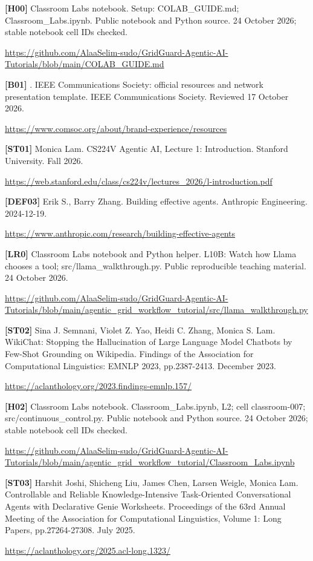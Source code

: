 \documentclass[12pt,letterpaper]{article}
\begin{document}
{\small
\textbf{[H00]} Classroom Labs notebook. Setup: COLAB\_\allowbreak{}GUIDE.md; Classroom\_\allowbreak{}Labs.ipynb. Public notebook and Python source. 24 October 2026; stable notebook cell IDs checked.\par\url{https://github.com/AlaaSelim-sudo/GridGuard-Agentic-AI-Tutorials/blob/main/COLAB_GUIDE.md}\par\medskip
\textbf{[B01]} . IEEE Communications Society: official resources and network presentation template. IEEE Communications Society. Reviewed 17 October 2026.\par\url{https://www.comsoc.org/about/brand-experience/resources}\par\medskip
\textbf{[ST01]} Monica Lam. CS224V Agentic AI, Lecture 1: Introduction. Stanford University. Fall 2026.\par\url{https://web.stanford.edu/class/cs224v/lectures_2026/l-introduction.pdf}\par\medskip
\textbf{[DEF03]} Erik S., Barry Zhang. Building effective agents. Anthropic Engineering. 2024-12-19.\par\url{https://www.anthropic.com/research/building-effective-agents}\par\medskip
\textbf{[LR0]} Classroom Labs notebook and Python helper. L10B: Watch how Llama chooses a tool; src/\allowbreak{}llama\_\allowbreak{}walkthrough.py. Public reproducible teaching material. 24 October 2026.\par\url{https://github.com/AlaaSelim-sudo/GridGuard-Agentic-AI-Tutorials/blob/main/agentic_grid_workflow_tutorial/src/llama_walkthrough.py}\par\medskip
\textbf{[ST02]} Sina J. Semnani, Violet Z. Yao, Heidi C. Zhang, Monica S. Lam. WikiChat: Stopping the Hallucination of Large Language Model Chatbots by Few-Shot Grounding on Wikipedia. Findings of the Association for Computational Linguistics: EMNLP 2023, pp.2387-2413. December 2023.\par\url{https://aclanthology.org/2023.findings-emnlp.157/}\par\medskip
\textbf{[H02]} Classroom Labs notebook. Classroom\_\allowbreak{}Labs.ipynb, L2; cell classroom-007; src/\allowbreak{}continuous\_\allowbreak{}control.py. Public notebook and Python source. 24 October 2026; stable notebook cell IDs checked.\par\url{https://github.com/AlaaSelim-sudo/GridGuard-Agentic-AI-Tutorials/blob/main/agentic_grid_workflow_tutorial/Classroom_Labs.ipynb}\par\medskip
\textbf{[ST03]} Harshit Joshi, Shicheng Liu, James Chen, Larsen Weigle, Monica Lam. Controllable and Reliable Knowledge-Intensive Task-Oriented Conversational Agents with Declarative Genie Worksheets. Proceedings of the 63rd Annual Meeting of the Association for Computational Linguistics, Volume 1: Long Papers, pp.27264-27308. July 2025.\par\url{https://aclanthology.org/2025.acl-long.1323/}\par\medskip
}
\end{document}
